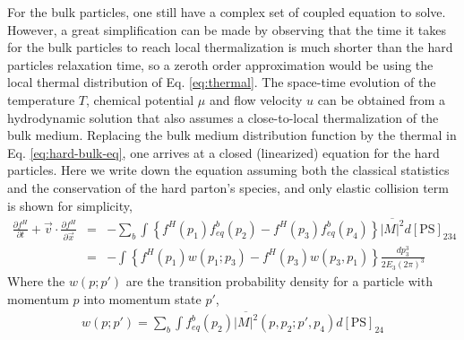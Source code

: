 For the bulk particles, one still have a complex set of coupled equation to solve. 
However, a great simplification can be made by observing that the time it takes for the bulk particles to reach local thermalization is much shorter than the hard particles relaxation time, so a zeroth order approximation would be using the local thermal distribution of Eq. \ref{eq:thermal}.
The space-time evolution of the temperature $T$, chemical potential $\mu$ and flow velocity $u$ can be obtained from a hydrodynamic solution that also assumes a close-to-local thermalization of the bulk medium.
Replacing the bulk medium distribution function by the thermal in Eq. \ref{eq:hard-bulk-eq}, one arrives at a closed (linearized) equation for the hard particles.
Here we write down the equation assuming both the classical statistics and the conservation of the hard parton's species, and only elastic collision term is shown for simplicity,
\begin{eqnarray}
\frac{\partial f^H}{\partial t} + \vec{v}\cdot\frac{\partial f^H}{\partial \vec{x}} &=& -\sum_{b} \int \left\{
f^H(p_1)f^b_{eq}(p_2) - f^H(p_3)f^b_{eq}(p_4)\right\}
\overline{|M|^2} d[\textrm{PS}]_{234} \\
&=& - \int \left\{
f^H(p_1) w(p_1; p_3) - f^H(p_3) w(p_3, p_1)\right\}\frac{dp_3^3}{2E_3 (2\pi)^3}
\end{eqnarray}
Where the $w(p; p')$ are the transition probability density for a particle with momentum $p$ into momentum state $p'$,
\begin{eqnarray}
w(p; p') = \sum_b\int f_{eq}^b(p_2) \overline{|M|^2}(p, p_2; p', p_4) d[\textrm{PS}]_{24}
\end{eqnarray}

